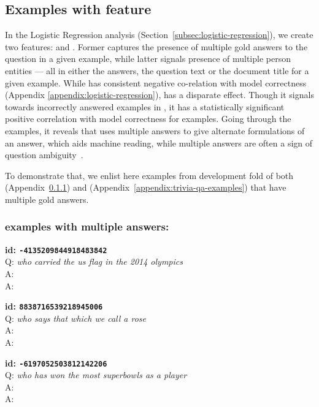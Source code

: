 \subsection{Examples with  feature}
\label{appendix:multi-answers-examples}
In the Logistic Regression analysis (Section~\ref{subsec:logistic-regression}), we create two features:  and . Former captures the presence of multiple gold answers to the question in a given example, while latter signals presence of multiple person entities — all in either the answers, the question text or the document title for a given example. While  has consistent negative co-relation with model correctness (Appendix \ref{appendix:logistic-regression}),  has a disparate effect.
Though it signals towards incorrectly answered examples in \nq{}, it has a statistically significant positive correlation with model correctness for \triviaqa{} examples. Going through the examples, it reveals that \triviaqa{} uses multiple answers to give alternate formulations of an answer, which aids machine reading, while multiple \nq{} answers are often a sign of question ambiguity~\cite{min-etal-2020-ambigqa}.

To demonstrate that, we enlist here examples from development fold of both \nq{} (Appendix~\ref{appendix:nq-examples}) and \triviaqa{} (Appendix~\ref{appendix:trivia-qa-examples}) that have multiple gold answers.

\subsubsection{\nq{} examples with multiple answers:}
\label{appendix:nq-examples}
\setlength{\parindent}{0em}
\tiny{\setlength{\parindent}{0cm}
\textbf{id: \texttt{-4135209844918483842}} \\
Q: \textit{who carried the us flag in the 2014 olympics} \\
A:  \\
A: }

\tiny{\setlength{\parindent}{0cm}
\textbf{id: \texttt{8838716539218945006}} \\
Q: \textit{who says that which we call a rose} \\
A:  \\
A: }

\tiny{\setlength{\parindent}{0cm}
\textbf{id: \texttt{-6197052503812142206}} \\
Q: \textit{who has won the most superbowls as a player} \\
A:  \\
A: }

